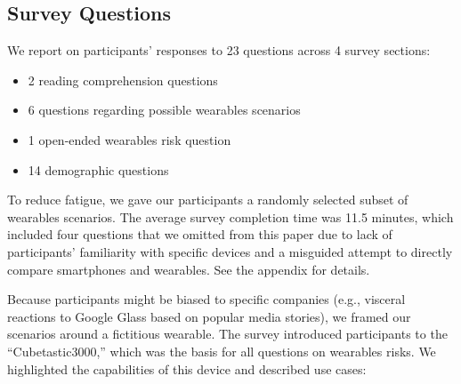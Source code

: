 \documentclass[conference]{IEEEtran}
\begin{document}
\subsection{Survey Questions}
\noindent We report on participants' responses to 23 questions across 4 survey sections:  

\begin{itemize} \itemsep1pt \parskip0pt 
\item 2 reading comprehension questions
\item 6 questions regarding possible wearables scenarios
\item 1 open-ended wearables risk question
\item 14 demographic questions 
\end{itemize}

To reduce fatigue, we gave our participants a randomly selected subset of wearables scenarios. The average survey completion time was 11.5 minutes, which included four questions that we omitted from this paper due to lack of participants' familiarity with specific devices and a misguided attempt to directly compare smartphones and wearables. See the appendix for details.

Because participants might be biased to specific companies (e.g., visceral reactions to Google Glass based on popular media stories), we framed our scenarios around a fictitious wearable. The survey introduced participants to the ``Cubetastic3000,'' which was the basis for all questions on wearables risks. We highlighted the capabilities of this device and described use cases:
\end{document}
